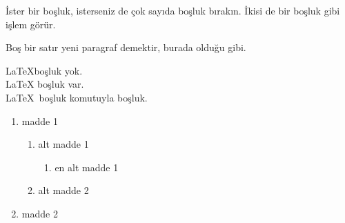 \documentclass[preview,multi=page,margin=2mm]{standalone}
\begin{document}
\begin{page}
 İster bir boşluk, isterseniz de çok         sayıda boşluk bırakın. 
İkisi de bir boşluk gibi işlem görür. 

Boş bir satır yeni paragraf demektir, burada olduğu gibi.
\end{page}
\begin{page}
\LaTeX  boşluk yok.\\
\LaTeX{} boşluk var.\\
\LaTeX\ boşluk komutuyla  boşluk.
\end{page}


\begin{page}
\begin{enumerate}
	\item madde 1
	\begin{enumerate}
		\item alt madde 1
		\begin{enumerate}
			\item en alt madde 1
		\end{enumerate}
		\item alt madde 2
	\end{enumerate}
	\item madde 2
\end{enumerate}
\end{page}
\end{document}
